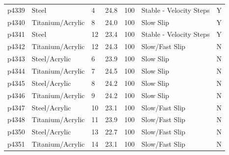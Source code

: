 \documentclass[11pt]{article}
\begin{document}
\begin{center}
\begin{tabular}{ | l l p{1.6cm} p{1.7cm} p{1.6cm} p{4cm} p{0.5cm} | }
p4339      & Steel            & 4                   & 24.8            & 100                   & Stable - Velocity Steps         & Y              \\
p4340	     & Titanium/Acrylic & 8                   & 24.0            & 100                   & Slow Slip                       & Y              \\
p4341	     & Steel            & 12                  & 23.4            & 100                   & Stable - Velocity Steps         & Y              \\
p4342	     & Titanium/Acrylic & 12                  & 24.3            & 100                   & Slow/Fast Slip                  & N              \\
p4343	     & Steel/Acrylic    & 6                   & 23.9            & 100                   & Slow Slip                       & N              \\
p4344	     & Titanium/Acrylic & 7                   & 24.5            & 100                   & Slow Slip                       & N              \\
p4345	     & Steel/Acrylic    & 8                   & 24.2            & 100                   & Slow Slip                       & N              \\
p4346	     & Titanium/Acrylic & 9                   & 24.2            & 100                   & Slow Slip                       & N              \\
p4347	     & Steel/Acrylic    & 10                  & 23.1            & 100                   & Slow/Fast Slip                  & N              \\
p4348	     & Titanium/Acrylic & 11                  & 23.9            & 100                   & Slow/Fast Slip                  & N              \\
p4350	     & Steel/Acrylic    & 13                  & 22.7            & 100                   & Slow/Fast Slip                  & N              \\
p4351	     & Titanium/Acrylic & 14                  & 23.1            & 100                   & Slow/Fast Slip                  & N              \\


    \hline
    \end{tabular}
\end{center}
\end{document}
